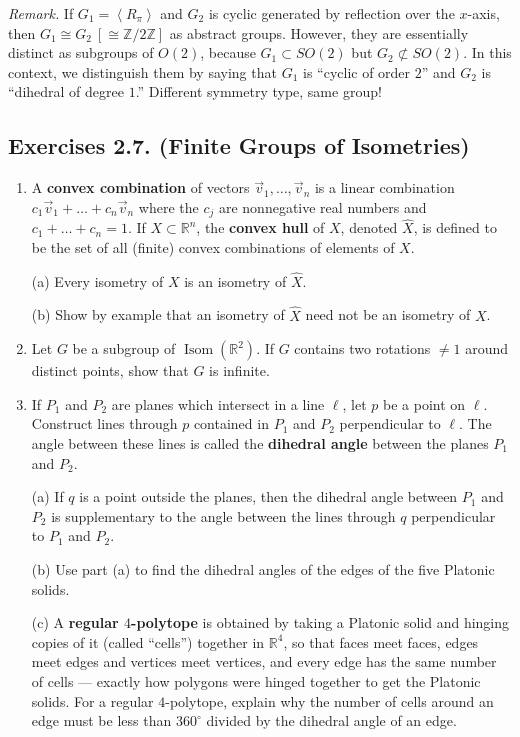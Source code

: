 \documentclass[leqno]{book}
\begin{document}
\noindent\emph{Remark.} If $G_1=\left<R_\pi\right>$ and $G_2$ is cyclic generated by reflection over the $x$-axis, then $G_1\cong G_2~[\cong\mathbb Z/2\mathbb Z]$ as abstract groups.  However, they are essentially distinct as subgroups of $O(2)$, because $G_1\subset SO(2)$ but $G_2\not\subset SO(2)$.  In this context, we distinguish them by saying that $G_1$ is ``cyclic of order $2$'' and $G_2$ is ``dihedral of degree $1$.''  Different symmetry type, same group!

\subsection*{Exercises 2.7. (Finite Groups of Isometries)}
\begin{enumerate}
\item A \textbf{convex combination} of vectors $\vec v_1,\dots,\vec v_n$ is a linear combination $c_1\vec v_1+\dots+c_n\vec v_n$ where the $c_j$ are nonnegative real numbers and $c_1+\dots+c_n=1$.  If $X\subset\mathbb R^n$, the \textbf{convex hull} of $X$, denoted $\hat X$, is defined to be the set of all (finite) convex combinations of elements of $X$.

(a) Every isometry of $X$ is an isometry of $\hat X$.

(b) Show by example that an isometry of $\hat X$ need not be an isometry of $X$.

\item Let $G$ be a subgroup of $\operatorname{Isom}(\mathbb R^2)$.  If $G$ contains two rotations $\ne 1$ around distinct points, show that $G$ is infinite.

\item If $P_1$ and $P_2$ are planes which intersect in a line $\ell$, let $p$ be a point on $\ell$.  Construct lines through $p$ contained in $P_1$ and $P_2$ perpendicular to $\ell$.  The angle between these lines is called the \textbf{dihedral angle} between the planes $P_1$ and $P_2$.

(a) If $q$ is a point outside the planes, then the dihedral angle between $P_1$ and $P_2$ is supplementary to the angle between the lines through $q$ perpendicular to $P_1$ and $P_2$.

(b) Use part (a) to find the dihedral angles of the edges of the five Platonic solids.

(c) A \textbf{regular $4$-polytope} is obtained by taking a Platonic solid and hinging copies of it (called ``cells'') together in $\mathbb R^4$, so that faces meet faces, edges meet edges and vertices meet vertices, and every edge has the same number of cells \---- exactly how polygons were hinged together to get the Platonic solids.  For a regular $4$-polytope, explain why the number of cells around an edge must be less than $360^\circ$ divided by the dihedral angle of an edge.


\end{enumerate}
\end{document}
